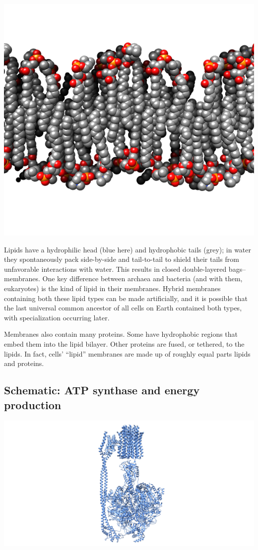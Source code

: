 \documentclass[]{tufte-book}
\begin{document}
\includegraphics{img/schematics/2_1_1}

Lipids have a hydrophilic head (blue here) and hydrophobic tails (grey);
in water they spontaneously pack side-by-side and tail-to-tail to shield
their tails from unfavorable interactions with water. This results in
closed double-layered bags--membranes. One key difference between
archaea and bacteria (and with them, eukaryotes) is the kind of lipid in
their membranes. Hybrid membranes containing both these lipid types can
be made artificially, and it is possible that the last universal common
ancestor of all cells on Earth contained both types, with specialization
occurring later.

Membranes also contain many proteins. Some have hydrophobic regions that
embed them into the lipid bilayer. Other proteins are fused, or
tethered, to the lipids. In fact, cells' ``lipid'' membranes are made up
of roughly equal parts lipids and proteins.

\hypertarget{ATP_synthase_and_energy_production}{\subsection*{Schematic:
ATP synthase and energy
production}\label{ATP_synthase_and_energy_production}}

\includegraphics{img/schematics/2_1_2}
\end{document}
